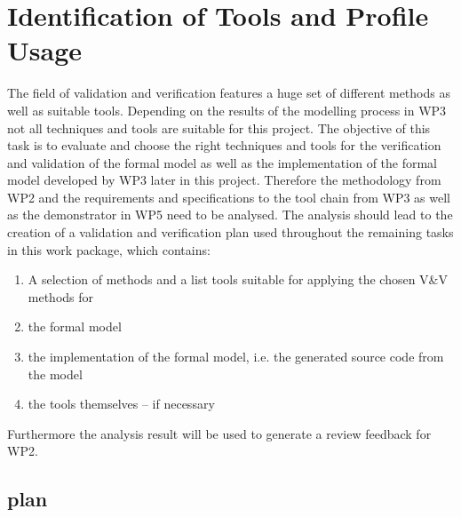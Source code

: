 \section{Identification of Tools and Profile Usage}
\tbc
The field of validation and verification features a huge set of different methods as well as suitable tools. Depending on the results of the modelling process in WP3 not all techniques and tools are suitable for this project.
The objective of this task is to evaluate and choose the right techniques and tools for the verification and validation of the formal model as well as the implementation of the formal model developed by WP3 later in this project. Therefore the methodology from WP2 and the requirements and specifications to the tool chain from WP3 as well as the demonstrator in WP5 need to be analysed. The analysis should lead to the creation of a validation and verification plan used throughout the remaining tasks in this work package, which contains:

\begin{enumerate}
\item A selection of methods and a list tools suitable for applying the chosen V\&V methods for
\item  the formal model
\item  the implementation of the formal model, i.e. the generated source code from the model
\item  the tools themselves – if necessary
\end{enumerate}
Furthermore the analysis result will be used to generate a review feedback for WP2.


\subsection{\VV plan}
\tbd

